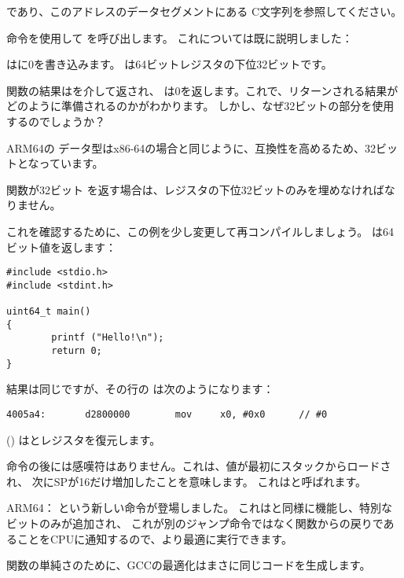 であり、このアドレスのデータセグメントにある C文字列を参照してください。


命令を使用して \puts を呼び出します。 これについては既に説明しました：

\MOV はに0を書き込みます。 
は64ビットレジスタの下位32ビットです。



関数の結果はを介して返され、 \main は0を返します。これで、リターンされる結果がどのように準備されるのかがわかります。
しかし、なぜ32ビットの部分を使用するのでしょうか？

ARM64の \Tint データ型はx86-64の場合と同じように、互換性を高めるため、32ビットとなっています。

関数が32ビット \Tint を返す場合は、レジスタの下位32ビットのみを埋めなければなりません。

これを確認するために、この例を少し変更して再コンパイルしましょう。 \main は64ビット値を返します：

\begin{lstlisting}[caption=\main returning a value of \TT{uint64\_t} type,style=customc]
#include <stdio.h>
#include <stdint.h>

uint64_t main()
{
        printf ("Hello!\n");
        return 0;
}
\end{lstlisting}

結果は同じですが、その行の \MOV は次のようになります：

\begin{lstlisting}[caption=\NonOptimizing GCC 4.8.1 + objdump]
  4005a4:       d2800000        mov     x0, #0x0      // #0
\end{lstlisting}


 () はとレジスタを復元します。

命令の後には感嘆符はありません。これは、値が最初にスタックからロードされ、
次に\ac{SP}が16だけ増加したことを意味します。
これはと呼ばれます。

ARM64： \RET という新しい命令が登場しました。 
これはと同様に機能し、特別なビットのみが追加され、
これが別のジャンプ命令ではなく関数からの戻りであることを\ac{CPU}に通知するので、より最適に実行できます。

関数の単純さのために、GCCの最適化はまさに同じコードを生成します。
